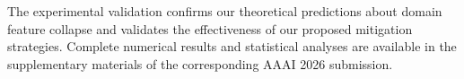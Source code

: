 The experimental validation confirms our theoretical predictions about domain feature collapse and validates the effectiveness of our proposed mitigation strategies. Complete numerical results and statistical analyses are available in the supplementary materials of the corresponding AAAI 2026 submission.
